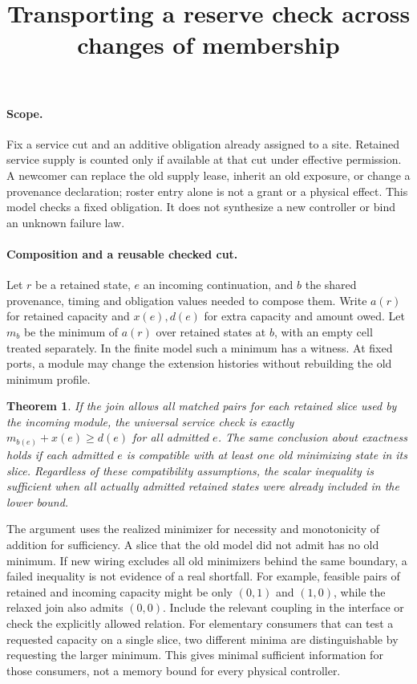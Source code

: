 \documentclass{article}
\newtheorem{theorem}{Theorem}
\begin{document}
\title{Transporting a reserve check across changes of membership}
\maketitle

\paragraph{Scope.}
Fix a service cut and an additive obligation already assigned to a site.
Retained service supply is counted only if available at that cut under
effective permission. A newcomer can replace the old supply lease, inherit an
old exposure, or change a provenance declaration; roster entry alone is not a
grant or a physical effect. This model checks a fixed obligation. It does not
synthesize a new controller or bind an unknown failure law.

\paragraph{Composition and a reusable checked cut.}
Let $r$ be a retained state, $e$ an incoming continuation, and $b$ the
shared provenance, timing and obligation values needed to compose them.
Write $a(r)$ for retained capacity and $x(e),d(e)$ for extra capacity and
amount owed. Let $m_b$ be the minimum of $a(r)$ over retained states at $b$,
with an empty cell treated separately. In the finite model such a minimum
has a witness. At fixed ports, a module may change the extension histories
without rebuilding the old minimum profile.

\begin{theorem}
If the join allows all matched pairs for each retained slice used by the
incoming module, the universal service check is exactly
$m_{b(e)}+x(e)\ge d(e)$ for all admitted $e$. The same conclusion about
exactness holds if each admitted $e$ is compatible with at least one
old minimizing state in its slice. Regardless of these compatibility
assumptions, the scalar inequality is sufficient when all actually
admitted retained states were already included in the lower bound.
\end{theorem}

The argument uses the realized minimizer for necessity and monotonicity
of addition for sufficiency. A slice that the old model did not admit has
no old minimum. If new wiring excludes all old minimizers behind the same
boundary, a failed inequality is not evidence of a real shortfall. For
example, feasible pairs of retained and incoming capacity might be only
$(0,1)$ and $(1,0)$, while the relaxed join also admits $(0,0)$.
Include the relevant coupling in the interface or check the explicitly
allowed relation. For elementary consumers that can test a requested
capacity on a single slice, two different minima are distinguishable
by requesting the larger minimum. This gives minimal sufficient
information for those consumers, not a memory bound for every physical
controller.
\end{document}
